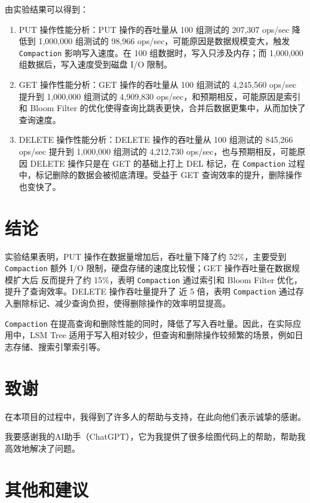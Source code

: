 \documentclass[fontset=windows]{article}
\begin{document}
		
		由实验结果可以得到：
        \begin{enumerate}
		\item PUT 操作性能分析：PUT 操作的吞吐量从 100 组测试的 207,307 ops/sec 降低到 1,000,000 组测试的 98,966 ops/sec，可能原因是数据规模变大，触发 \texttt{Compaction} 影响写入速度。在 100 组数据时，写入只涉及内存；而 1,000,000 组数据后，写入速度受到磁盘 I/O 限制。
		\item GET 操作性能分析：GET 操作的吞吐量从 100 组测试的 4,245,560 ops/sec 提升到 1,000,000 组测试的 4,909,830 ops/sec，和预期相反，可能原因是索引和 Bloom Filter 的优化使得查询比跳表更快，合并后数据更集中，从而加快了查询速度。
		\item DELETE 操作性能分析：DELETE 操作的吞吐量从 100 组测试的 845,266 ops/sec 提升到 1,000,000 组测试的 4,212,730 ops/sec，也与预期相反，可能原因 DELETE 操作只是在 GET 的基础上打上 DEL 标记，在 \texttt{Compaction} 过程中，标记删除的数据会被彻底清理。受益于 GET 查询效率的提升，删除操作也变快了。
		\end{enumerate}


	\section{结论}
	\hspace{2em}实验结果表明，PUT 操作在数据量增加后，吞吐量下降了约 52\%，主要受到 \texttt{Compaction} 额外 I/O 限制，硬盘存储的速度比较慢；GET 操作吞吐量在数据规模扩大后 反而提升了约 15\%，表明 \texttt{Compaction} 通过索引和 Bloom Filter 优化，提升了查询效率。DELETE 操作吞吐量提升了 近 5 倍，表明 \texttt{Compaction} 通过存入删除标记、减少查询负担，使得删除操作的效率明显提高。
	
	\texttt{Compaction} 在提高查询和删除性能的同时，降低了写入吞吐量。因此，在实际应用中，LSM Tree 适用于写入相对较少，但查询和删除操作较频繁的场景，例如日志存储、搜索引擎索引等。
	
	\section{致谢}
	
	\hspace{2em}在本项目的过程中，我得到了许多人的帮助与支持，在此向他们表示诚挚的感谢。
	
	我要感谢我的AI助手（ChatGPT），它为我提供了很多绘图代码上的帮助，帮助我高效地解决了问题。
	
	
	\section{其他和建议}
\end{document}
